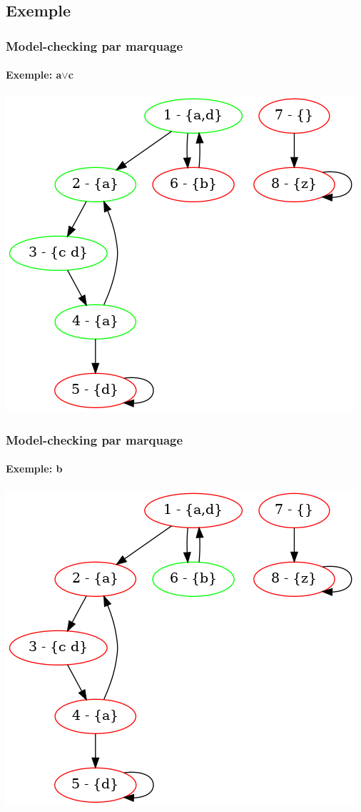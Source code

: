 \documentclass[11pt]{beamer}
\begin{document}
\subsection{Exemple}
\begin{frame}
    \frametitle{Model-checking par marquage}
    \framesubtitle{Exemple: a$\lor$c}
	\begin{center}
		\includegraphics[scale=0.4]{imgs/marquage1.png}
	\end{center}
\end{frame}

\begin{frame}
    \frametitle{Model-checking par marquage}
    \framesubtitle{Exemple: b}

	\begin{center}
	\includegraphics[scale=0.4]{imgs/marquage2.png}
\end{center}
\end{frame}
\end{document}
